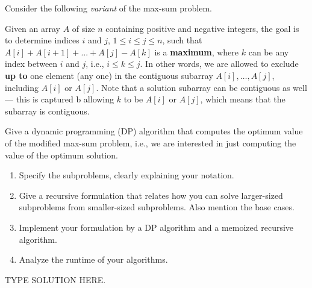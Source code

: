 \documentclass[draft]{article}
\begin{document}
\begin{exercise}{6.11}
    Consider the following \emph{variant} of the max-sum problem.

    Given an array $A$ of size $n$ containing positive and negative integers, the goal is to determine indices $i$ and $j$, $1 \leq i \leq j \leq n$, such that $A[i] + A[i+1] + ... + A[j] - A[k]$ is a \textbf{maximum}, where $k$ can be any index between $i$ and $j$, i.e., $ i \leq k \leq j$. In other words, we are allowed to exclude \textbf{up to} one element (any one) in the contiguous subarray $A[i], \dots, A[j]$, including $A[i]$ or $A[j]$. Note that a solution subarray can be contiguous as well --- this is captured b allowing $k$ to be $A[i]$ or $A[j]$, which means that the subarray is contiguous.

    Give a dynamic programming (DP) algorithm that computes the optimum value of the modified max-sum problem, i.e., we are interested in just computing the value of the optimum solution.
    \begin{enumerate}
        \item Specify the subproblems, clearly explaining your notation.
        \item Give a recursive formulation that relates how you can solve larger-sized subproblems from smaller-sized subproblems. Also mention the base cases.
        \item Implement your formulation by a DP algorithm and a memoized recursive algorithm.
        \item Analyze the runtime of your algorithms.
    \end{enumerate}
\end{exercise}

\begin{solution}
    TYPE SOLUTION HERE.
\end{solution}
\end{document}
